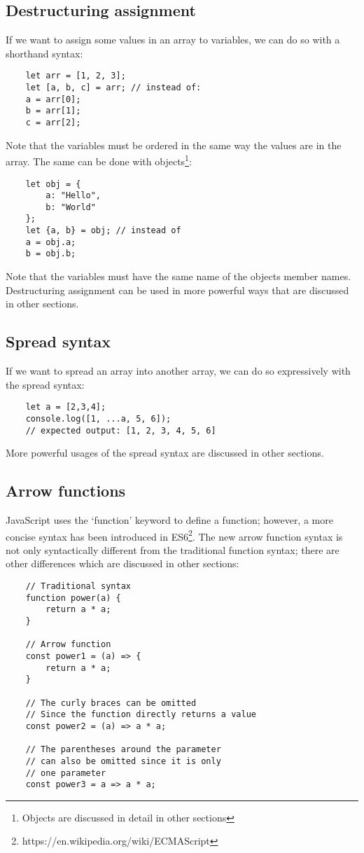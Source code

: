 \documentclass[11pt,a4paper]{article}
\begin{document}
\subsection{Destructuring assignment}
If we want to assign some values in an array to variables, we can do so with a shorthand syntax:
\begin{verbatim}
    let arr = [1, 2, 3];
    let [a, b, c] = arr; // instead of:
    a = arr[0];
    b = arr[1];
    c = arr[2];
\end{verbatim}
Note that the variables must be ordered in the same way the values are in the array.
The same can be done with objects\footnote{Objects are discussed in detail in other sections}:
\begin{verbatim}
    let obj = {
        a: "Hello",
        b: "World"
    };
    let {a, b} = obj; // instead of
    a = obj.a;
    b = obj.b;
\end{verbatim}
Note that the variables must have the same name of the objects member names. Destructuring assignment can be used in more
powerful ways that are discussed in other sections.

\subsection{Spread syntax}
If we want to spread an array into another array, we can do so expressively with the spread syntax:
\begin{verbatim}
    let a = [2,3,4];
    console.log([1, ...a, 5, 6]);
    // expected output: [1, 2, 3, 4, 5, 6]
\end{verbatim}
More powerful usages of the spread syntax are discussed in other sections.

\subsection{Arrow functions}
JavaScript uses the `function' keyword to define a function; however, a more concise syntax has been introduced in
ES6\footnote{https://en.wikipedia.org/wiki/ECMAScript}. The new arrow function syntax is not only syntactically
different from the traditional function syntax; there are other differences which are discussed in other sections:
\begin{verbatim}
    // Traditional syntax
    function power(a) {
        return a * a;
    }

    // Arrow function
    const power1 = (a) => {
        return a * a;
    }

    // The curly braces can be omitted
    // Since the function directly returns a value
    const power2 = (a) => a * a;

    // The parentheses around the parameter
    // can also be omitted since it is only
    // one parameter
    const power3 = a => a * a;
\end{verbatim}
\end{document}
